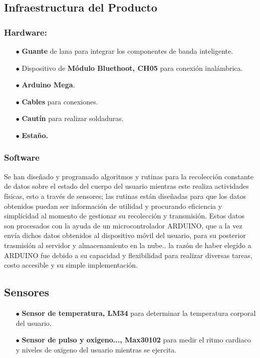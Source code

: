 \documentclass[osajnl,twocolumn,showpacs,superscriptaddress,10pt]{revtex4-1}
\begin{document}
\subsection{Infraestructura del Producto}
\subsubsection{Hardware:}
\begin{itemize}
    \item[$\bullet$]\textbf{Guante} de lana para integrar los componentes de banda inteligente.
    \item[$\bullet$]Dispositivo de \textbf{Módulo Bluethoot, CH05} para conexión inalámbrica.
    \item[$\bullet$]\textbf{Arduino Mega}.
    \item[$\bullet$]\textbf{Cables} para conexiones.
    \item[$\bullet$]\textbf{Cautín} para realizar soldaduras.
    \item[$\bullet$]\textbf{Estaño.}
\end{itemize}
\subsubsection{Software}
    Se han diseñado y programado algoritmos y rutinas para la recolección constante de datos sobre el estado del cuerpo del usuario mientras este realiza actividades físicas, esto a través de sensores; las rutinas están diseñadas para que los datos obtenidos puedan ser información de utilidad y procurando eficiencia y simplicidad al momento de gestionar su recolección y transmisión. Estos datos son procesados con la ayuda de un microcontrolador ARDUINO, que a la vez envía dichos datos obtenidos al dispositivo móvil del usuario, para su posterior trasmisión al servidor y almacenamiento en la nube.. la razón de haber elegido a ARDUINO fue debido a su capacidad y flexibilidad para realizar diversas tareas, costo accesible y su simple implementación.
    
\subsection{Sensores}
\begin{itemize}
    \item[$\bullet$]\textbf{Sensor de temperatura, LM34} para determinar la temperatura corporal del usuario.
    \item[$\bullet$]\textbf{Sensor de pulso y oxigeno..., Max30102} para medir el ritmo cardiaco y niveles de oxigeno del usuario mientras se ejercita.
\end{itemize}
\end{document}
